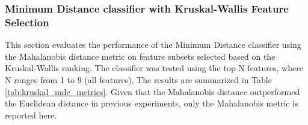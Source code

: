 \documentclass[12pt,a4paper]{article}
\begin{document}
\subsubsection*{Minimum Distance classifier with Kruskal-Wallis Feature Selection}
This section evaluates the performance of the Minimum Distance classifier using the Mahalanobis distance metric on feature subsets selected based on the Kruskal-Wallis ranking. The classifier was tested using the top N features, where N ranges from 1 to 9 (all features). The results are summarized in Table \ref{tab:kruskal_mdc_metrics}. Given that the Mahalanobis distance outperformed the Euclidean distance in previous experiments, only the Mahalanobis metric is reported here.

\begin{table}[H]
    \centering
    \caption{Performance of Minimum Distance classifier with Top N Kruskal-Wallis Features (Mean $\pm$ STD).}
    \label{tab:kruskal_mdc_metrics}
\end{table}
\end{document}

